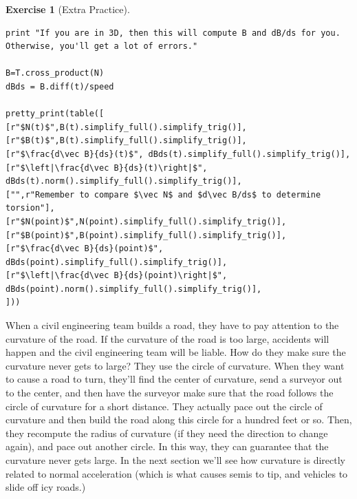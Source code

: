 \documentclass[10pt,]{book}
\theoremstyle{plain}
\theoremstyle{definition}
\theoremstyle{definition}
\theoremstyle{definition}
\theoremstyle{definition}
\newtheorem{exploration}[project]{Exercise}
\theoremstyle{definition}
\numberwithin{equation}{section}
\begin{document}
\begin{exploration}[Extra Practice]
\begin{lstlisting}[style=sageinput]
print "If you are in 3D, then this will compute B and dB/ds for you. Otherwise, you'll get a lot of errors."

B=T.cross_product(N)
dBds = B.diff(t)/speed

pretty_print(table([
[r"$N(t)$",B(t).simplify_full().simplify_trig()],
[r"$B(t)$",B(t).simplify_full().simplify_trig()],
[r"$\frac{d\vec B}{ds}(t)$", dBds(t).simplify_full().simplify_trig()],
[r"$\left|\frac{d\vec B}{ds}(t)\right|$", dBds(t).norm().simplify_full().simplify_trig()],
["",r"Remember to compare $\vec N$ and $d\vec B/ds$ to determine torsion"],
[r"$N(point)$",N(point).simplify_full().simplify_trig()],
[r"$B(point)$",B(point).simplify_full().simplify_trig()],
[r"$\frac{d\vec B}{ds}(point)$", dBds(point).simplify_full().simplify_trig()],
[r"$\left|\frac{d\vec B}{ds}(point)\right|$", dBds(point).norm().simplify_full().simplify_trig()],
]))
\end{lstlisting}
\end{exploration}
When a civil engineering team builds a road, they have to pay attention to the curvature of the road. If the curvature of the road is too large, accidents will happen and the civil engineering team will be liable. How do they make sure the curvature never gets to large? They use the circle of curvature. When they want to cause a road to turn, they'll find the center of curvature, send a surveyor out to the center, and then have the surveyor make sure that the road follows the circle of curvature for a short distance. They actually pace out the circle of curvature and then build the road along this circle for a hundred feet or so. Then, they recompute the radius of curvature (if they need the direction to change again), and pace out another circle. In this way, they can guarantee that the curvature never gets large. In the next section we'll see how curvature is directly related to normal acceleration (which is what causes semis to tip, and vehicles to slide off icy roads.)%
\typeout{************************************************}
\typeout{************************************************}
\end{document}
